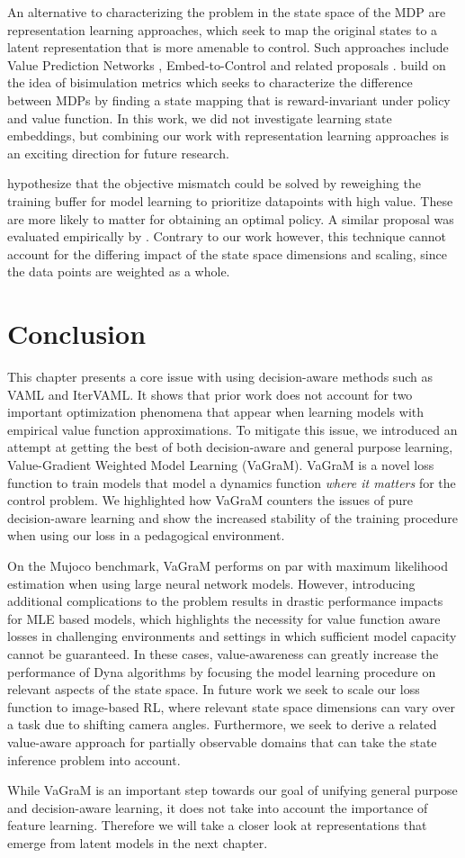 An alternative to characterizing the problem in the state space of the MDP are representation learning approaches, which seek to map the original states to a latent representation that is more amenable to control. Such approaches include Value Prediction Networks \parencite{NIPS2017_ffbd6cbb}, Embed-to-Control \parencite{10.5555/2969442.2969546} and related proposals \parencite{Levine2020Prediction,cui2021controlaware}. \cite{zhang2021learning} build on the idea of bisimulation metrics \parencite{ferns2004metrics,ferns2011bisimulation} which seeks to characterize the difference between MDPs by finding a state mapping that is reward-invariant under policy and value function. 
In this work, we did not investigate learning state embeddings, but combining our work with representation learning approaches is an exciting direction for future research.

\cite{lambert202objective} hypothesize that the objective mismatch could be solved by reweighing the training buffer for model learning to prioritize datapoints with high value. These are more likely to matter for obtaining an optimal policy. A similar proposal was evaluated empirically by \cite{nair2020goal}. Contrary to our work however, this technique cannot account for the differing impact of the state space dimensions and scaling, since the data points are weighted as a whole.


\section{Conclusion}
This chapter presents a core issue with using decision-aware methods such as VAML and IterVAML.
It shows that prior work does not account for two important optimization phenomena that appear when learning models with empirical value function approximations.
To mitigate this issue, we introduced an attempt at getting the best of both decision-aware and general purpose learning, Value-Gradient Weighted Model Learning (VaGraM).
VaGraM is a novel loss function to train models that model a dynamics function \emph{where it matters} for the control problem.
We highlighted how VaGraM counters the issues of pure decision-aware learning and show the increased stability of the training procedure when using our loss in a pedagogical environment.

On the Mujoco benchmark, VaGraM performs on par with maximum likelihood estimation when using large neural network models.
However, introducing additional complications to the problem results in drastic performance impacts for MLE based models, which highlights the necessity for value function aware losses in challenging environments and settings in which sufficient model capacity cannot be guaranteed.
In these cases, value-awareness can greatly increase the performance of Dyna algorithms by focusing the model learning procedure on relevant aspects of the state space.
In future work we seek to scale our loss function to image-based RL, where relevant state space dimensions can vary over a task due to shifting camera angles. 
Furthermore, we seek to derive a related value-aware approach for partially observable domains that can take the state inference problem into account.

While VaGraM is an important step towards our goal of unifying general purpose and decision-aware learning, it does not take into account the importance of feature learning.
Therefore we will take a closer look at representations that emerge from latent models in the next chapter.
